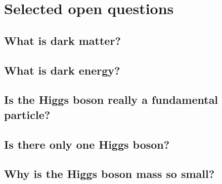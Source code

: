 \section{Selected open questions}\label{sec:open_questions}
\subsection{What is dark matter?}
\subsection{What is dark energy?}
\subsection{Is the Higgs boson really a fundamental particle?}
\subsection{Is there only one Higgs boson?}
\subsection{Why is the Higgs boson mass so small?}
